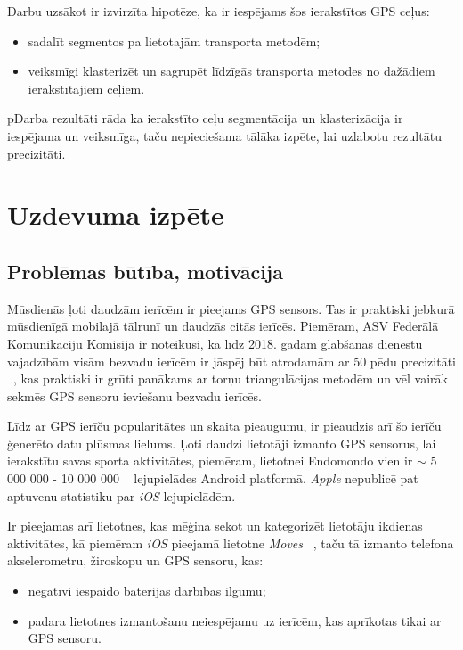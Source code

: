 \documentclass{ludis}
\begin{document}
Darbu uzsākot ir izvirzīta hipotēze, ka ir iespējams šos ierakstītos GPS ceļus:
\begin{itemize}
\item sadalīt segmentos pa lietotajām transporta metodēm;
\item veiksmīgi klasterizēt un sagrupēt līdzīgās transporta metodes no dažā\-diem ierakstītajiem ceļiem.
\end{itemize}


pDarba rezultāti rāda ka ierakstīto ceļu segmentācija un klasterizācija ir iespējama un veiksmīga,
taču nepieciešama tālāka izpēte, lai uzlabotu rezultātu precizitāti.

\chapter{Uzdevuma izpēte}
\section{Problēmas būtība, motivācija}
Mūsdienās ļoti daudzām ierīcēm ir pieejams GPS sensors. Tas ir praktiski jebkurā mūsdienīgā mobilajā
tālrunī un daudzās citās ierīcēs. Piemēram, ASV Federālā Komunikāciju Komisija ir noteikusi, ka līdz
2018. gadam glāb\-šanas dienestu vajadzībām visām bezvadu ierīcēm ir jāspēj būt atrodamām 
ar 50 pēdu precizitāti ~\cite{fcc_e911}, kas praktiski ir grūti panākams ar torņu trian\-gulācijas 
metodēm un vēl vairāk sekmēs GPS sensoru ieviešanu bezvadu ierīcēs.

Līdz ar GPS ierīču popularitātes un skaita pieaugumu, ir pieaudzis arī šo ierīču ģenerēto datu
plūsmas lielums. Ļoti daudzi lietotāji izmanto GPS sensorus, lai ierakstītu savas sporta aktivitātes,
piemēram, lietotnei Endo\-mondo vien ir $\sim$ 5 000 000 - 10 000 000 ~\cite{g_play_endomondo} 
lejupielādes Android platformā. \emph{Apple} nepublicē pat aptuvenu statistiku par \emph{iOS}
lejupielādēm.

Ir pieejamas arī lietotnes, kas mēģina sekot un kategorizēt lietotāju \linebreak ikdienas 
aktivitātes, kā piemēram \emph{iOS} pieejamā lietotne \emph{Moves} ~\cite{moves_app}, taču tā 
izmanto telefona akselerometru, žiroskopu un GPS sensoru, kas:
\begin{itemize}
\item negatīvi iespaido baterijas darbības ilgumu;
\item padara lietotnes izmantošanu neiespējamu uz ierīcēm, kas aprīkotas tikai ar GPS sensoru.
\end{itemize}
\end{document}
